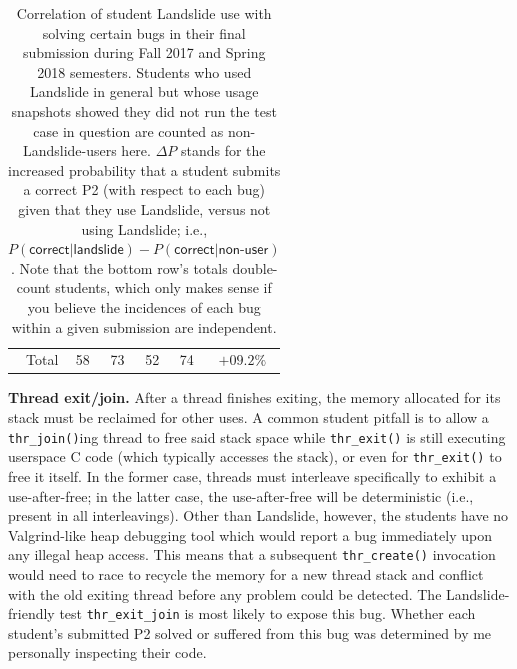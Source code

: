 \begin{table}[h]
\begin{center}
\begin{tabular}{r||cc|cc|c}
		Total     & 58	& 73	& 52	& 74	& $+09.2\%$ \\
	\end{tabular}
	\end{center}
	\caption{
		Correlation of student Landslide use with solving certain bugs in their final submission during Fall 2017 and Spring 2018 semesters.
		Students who used Landslide in general but whose usage snapshots showed they did not run the test case in question are counted as non-Landslide-users here.
		$\Delta P$ stands for the increased probability that a student submits a correct P2
		(with respect to each bug)
		given that they use Landslide, versus not using Landslide; i.e.,
		$P(\mathsf{correct}|\mathsf{landslide})-
		P(\mathsf{correct}|\mathsf{non\text{-}user})$.
		Note that the bottom row's totals double-count students,
		which only makes sense if you believe the incidences of each bug within a given submission are independent.
		}
	\label{tab:eval-common-bugs}
\end{table}

{\bf Thread exit/join.}
After a thread finishes exiting, the memory allocated for its stack must be reclaimed for other uses.
A common student pitfall is to allow a {\tt thr\_join()}ing thread to free said stack space
while {\tt thr\_exit()} is still executing userspace C code (which typically accesses the stack),
or even for {\tt thr\_exit()} to free it itself.
In the former case, threads must interleave specifically to exhibit a use-after-free;
in the latter case, the use-after-free will be deterministic (i.e., present in all interleavings).
Other than Landslide, however,
the students have no Valgrind-like heap debugging tool which would report a bug immediately upon any illegal heap access.
This means that a subsequent {\tt thr\_create()} invocation would need to race to recycle the memory for a new thread stack
and conflict with the old exiting thread
before any problem could be detected.
The Landslide-friendly test {\tt thr\_exit\_join} is most likely to expose this bug.
Whether each student's submitted P2 solved or suffered from this bug
was determined by me personally inspecting their code.

